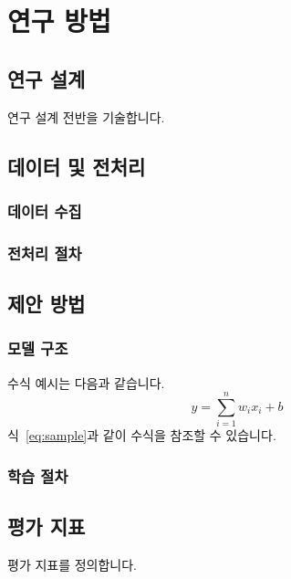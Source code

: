 \chapter{연구 방법}
\label{ch:method}

\section{연구 설계}

연구 설계 전반을 기술합니다.

\section{데이터 및 전처리}

\subsection{데이터 수집}

\subsection{전처리 절차}

\section{제안 방법}

\subsection{모델 구조}

수식 예시는 다음과 같습니다.
\begin{equation}
  \label{eq:sample}
  y = \sum_{i=1}^{n} w_i x_i + b
\end{equation}
식~\eqref{eq:sample}과 같이 수식을 참조할 수 있습니다.

\subsection{학습 절차}

\section{평가 지표}

평가 지표를 정의합니다.
